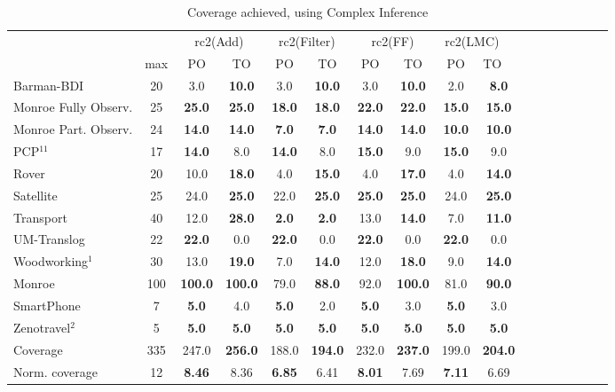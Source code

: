 \documentclass[letterpaper]{article} %
\begin{document}
\begin{table*}[h]
	\centering
	\caption{Coverage achieved, using Complex Inference}
	\scalebox{0.8} {
\begin{tabular}{lccccccccccccccccl} 
	\toprule 
	&& \multicolumn{2}{c}{rc2(Add)} & \multicolumn{2}{c}{rc2(Filter)} & \multicolumn{2}{c}{rc2(FF)} & \multicolumn{2}{c}{rc2(LMC)} \\ 
	\cmidrule(lr){3-4} \cmidrule(lr){5-6} \cmidrule(lr){7-8} \cmidrule(lr){9-10}  
	& max &PO & TO & PO & TO & PO & TO & PO &  TO \\ 
	\midrule 
	Barman-BDI & 20 & 3.0 & \textbf{10.0} & 3.0 & \textbf{10.0} & 3.0 & \textbf{10.0} & 2.0 &\multicolumn{2}{c}{ \textbf{8.0}  } \\ 
	Monroe Fully Observ. & 25 & \textbf{25.0} & \textbf{25.0} & \textbf{18.0} & \textbf{18.0} & \textbf{22.0} & \textbf{22.0} & \textbf{15.0} &\multicolumn{2}{c}{ \textbf{15.0}  } \\ 
	Monroe Part. Observ. & 24 & \textbf{14.0} & \textbf{14.0} & \textbf{7.0} & \textbf{7.0} & \textbf{14.0} & \textbf{14.0} & \textbf{10.0} &\multicolumn{2}{c}{ \textbf{10.0}  } \\ 
	PCP$^{11}$ & 17 & \textbf{14.0} & 8.0 & \textbf{14.0} & 8.0 & \textbf{15.0} & 9.0 & \textbf{15.0} &\multicolumn{2}{c}{ 9.0  } \\ 
	Rover & 20 & 10.0 & \textbf{18.0} & 4.0 & \textbf{15.0} & 4.0 & \textbf{17.0} & 4.0 &\multicolumn{2}{c}{ \textbf{14.0}  } \\ 
	Satellite & 25 & 24.0 & \textbf{25.0} & 22.0 & \textbf{25.0} & \textbf{25.0} & \textbf{25.0} & 24.0 &\multicolumn{2}{c}{ \textbf{25.0}  } \\ 
	Transport & 40 & 12.0 & \textbf{28.0} & \textbf{2.0} & \textbf{2.0} & 13.0 & \textbf{14.0} & 7.0 &\multicolumn{2}{c}{ \textbf{11.0}  } \\ 
	UM-Translog & 22 & \textbf{22.0} & 0.0 & \textbf{22.0} & 0.0 & \textbf{22.0} & 0.0 & \textbf{22.0} &\multicolumn{2}{c}{ 0.0  } \\ 
	Woodworking$^{1}$ & 30 & 13.0 & \textbf{19.0} & 7.0 & \textbf{14.0} & 12.0 & \textbf{18.0} & 9.0 &\multicolumn{2}{c}{ \textbf{14.0}  } \\ 
	\midrule 
	Monroe & 100 & \textbf{100.0} & \textbf{100.0} & 79.0 & \textbf{88.0} & 92.0 & \textbf{100.0} & 81.0 &\multicolumn{2}{c}{ \textbf{90.0}  } \\ 
	SmartPhone & 7 & \textbf{5.0} & 4.0 & \textbf{5.0} & 2.0 & \textbf{5.0} & 3.0 & \textbf{5.0} &\multicolumn{2}{c}{ 3.0  } \\ 
	Zenotravel$^{2}$ & 5 & \textbf{5.0} & \textbf{5.0} & \textbf{5.0} & \textbf{5.0} & \textbf{5.0} & \textbf{5.0} & \textbf{5.0} &\multicolumn{2}{c}{ \textbf{5.0}  } \\ 
	\midrule 
	Coverage & 335 & 247.0 & \textbf{256.0} & 188.0 & \textbf{194.0} & 232.0 & \textbf{237.0} & 199.0 &\multicolumn{2}{c}{ \textbf{204.0}  } \\ 
	Norm. coverage & 12 & \textbf{8.46} & 8.36 & \textbf{6.85} & 6.41 & \textbf{8.01} & 7.69 & \textbf{7.11} &\multicolumn{2}{c}{ 6.69  } \\  
	\bottomrule 
\end{tabular}  
	}
\end{table*}
\end{document}
